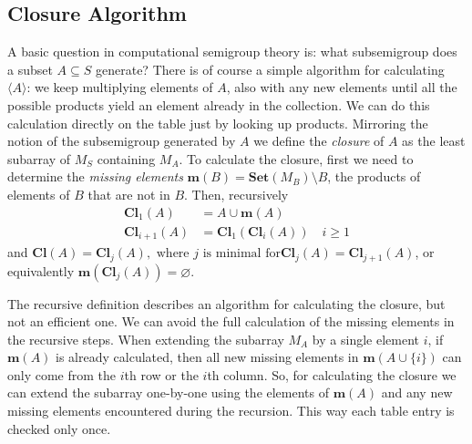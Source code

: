 \documentclass{amsart}
\newcommand{\Set}{\mathbf{Set}}
\newcommand{\Miss}{\mathbf{m}}
\newcommand{\Closure}{\mathbf{Cl}}
\newcommand{\todo}[1]{\textcolor{red}{ \small \textsf{[ #1 ]} \normalsize}}
\theoremstyle{plain}
\theoremstyle{definition}
\begin{document}
\subsection{Closure Algorithm}
A basic question in computational semigroup theory is: what subsemigroup does a subset $A\subseteq S$ generate?
There is of course a simple algorithm for calculating $\langle A\rangle$: we keep multiplying elements of $A$, also with any new elements until all the possible products yield an element already in the collection.
We can do this calculation directly on the table just by looking up products. 
Mirroring the notion of the subsemigroup generated by $A$ we define the
\emph{closure} of $A$ as the least subarray of $M_S$ containing $M_A$. %
To calculate
the closure, first we need to determine the \emph{missing elements}
$\Miss(B)=\Set(M_B)\setminus B$, the products of elements of
$B$ that are not in $B$. %
Then, recursively \begin{align*}
\Closure_1(A)&=A\cup\Miss(A)\\ \Closure_{i+1}(A)&=\Closure_1(\Closure_{i}(A))\quad i\geq 1
\end{align*} and $ \Closure(A)=\Closure_j(A), \text{ where $j$ is minimal for
}\Closure_j(A)=\Closure_{j+1}(A)$, or equivalently
$\Miss(\Closure_j(A))=\varnothing$.

The recursive definition describes an algorithm for calculating the closure, but not an efficient one. 
We can avoid the full calculation of the missing elements in the recursive steps.
When extending the subarray $M_A$ by a single element $i$, if $\Miss(A)$ is already calculated, then all new missing elements in $\Miss(A\cup\{i\})$ can only come from the $i$th row or the $i$th column.
So, for calculating the closure we can extend the subarray one-by-one using the elements of $\Miss(A)$ and any new missing elements encountered during the recursion.
This way each table entry is checked only once.
\end{document}
